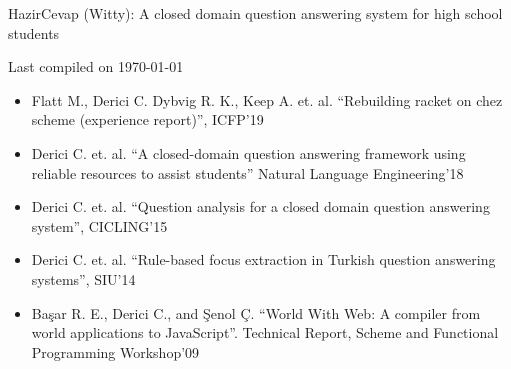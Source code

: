 
\headedsection %
{}
{} {
\vspace{-0.4cm}
\headedsubsection %
{}
{}
{\small{}}
}

\headedsection %
{}
{} {
\vspace{-0.4cm}
\headedsubsection %
{HazirCevap (Witty): A closed domain question answering system for high school students}
{}
{\small{}}
}

\vfill \hfill \small Last compiled on \today

\newpage

\spacedhrule{0.5em}{-0.4em} %



\begin{itemize}
\item Flatt M., Derici C. Dybvig R. K., Keep A. et. al. “Rebuilding racket on chez scheme (experience report)”, ICFP'19

\item Derici C. et. al. “A closed-domain question answering framework using reliable resources to assist students” \newline Natural Language Engineering'18

\item Derici C. et. al. “Question analysis for a closed domain question answering system”, CICLING'15

\item Derici C. et. al. “Rule-based focus extraction in Turkish question answering systems”, SIU'14

\item Başar R. E., Derici C., and Şenol Ç. “World With Web: A compiler from world applications to JavaScript”. Technical Report, Scheme and Functional Programming Workshop'09
\end{itemize}

